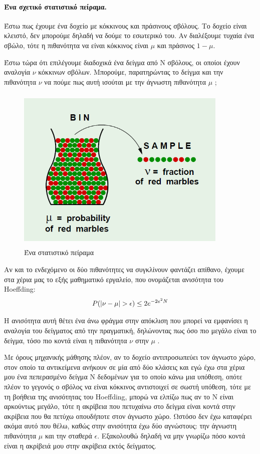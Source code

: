 \documentclass{article}
\DeclarePairedDelimiter\abs{\lvert}{\rvert}%
\begin{document}
\paragraph{Ένα σχετικό στατιστικό πείραμα.}Έστω πως έχουμε ένα δοχείο με κόκκινους και πράσινους σβόλους. Το δοχείο είναι κλειστό, δεν μπορούμε δηλαδή να δούμε το εσωτερικό του. Αν διαλέξουμε τυχαία ένα σβώλο, τότε η πιθανότητα να είναι κόκκινος είναι $\mu$ και πράσινος $1 -\mu$.

Έστω τώρα ότι επιλέγουμε διαδοχικά ένα δείγμα από Ν σβόλους, οι οποίοι έχουν αναλογία  $\nu$ κόκκινων σβόλων. Μπορούμε, παρατηρώντας το δείγμα και την πιθανότητα $\nu$ να πούμε πως αυτή ισούται
με την άγνωστη πιθανότητα $\mu$ ;
 \begin{figure}[H]
	\centering			
    \includegraphics[width=0.9\textwidth,height=8cm]{marbles.png}
    \caption[Ένα στατιστικό πείραμα]{Ένα στατιστικό πείραμα}
 \end{figure}
 
Αν και το ενδεχόμενο οι δύο πιθανότητες να συγκλίνουν φαντάζει απίθανο, έχουμε στα χέρια μας το εξής μαθηματικό εργαλείο, που ονομάζεται ανισότητα του Hoeffding:
$$ P( \abs{ \nu-\mu} > \epsilon ) \leq 2 e ^{-2 e^2 N}$$

Η ανισότητα αυτή θέτει ένα άνω φράγμα στην απόκλιση που μπορεί να εμφανίσει η αναλογία του δείγματος από την πραγματική, δηλώνοντας πως όσο πιο μεγάλο είναι το δείγμα, τόσο πιο κοντά είναι η πιθανότητα $\nu$ στην $\mu$ .

Με όρους μηχανικής μάθησης πλέον, αν το δοχείο αντιπροσωπεύει τον άγνωστο χώρο, στον οποίο τα αντικείμενα ανήκουν σε μία από δύο κλάσεις και εγώ έχω στα χέρια μου ένα πεπερασμένο δείγμα Ν δεδομένων για το οποίο κάνω μια υπόθεση, οπότε πλέον το γεγονός ο σβόλος να είναι κόκκινος αντιστοιχεί σε σωστή υπόθεση, τότε με τη βοήθεια της ανισότητας του Hoeffding, μπορώ να ελπίζω πως αν το Ν είναι αρκούντως μεγάλο, τότε η ακρίβεια που πετυχαίνω στο δείγμα είναι κοντά στην ακρίβεια που θα πετύχω οπουδήποτε στον άγνωστο χώρο. Ωστόσο δεν έχω καταφέρει ακόμα αυτό που θέλω, καθώς στην ανισότητα έχω δύο αγνώστους: την άγνωστη πιθανότητα $\mu$ και την σταθερά $\epsilon$. Εξακολουθώ δηλαδή να μην γνωρίζω πόσο κοντά είναι η ακρίβειά μου στην ακρίβεια εκτός δείγματος.
\end{document}
